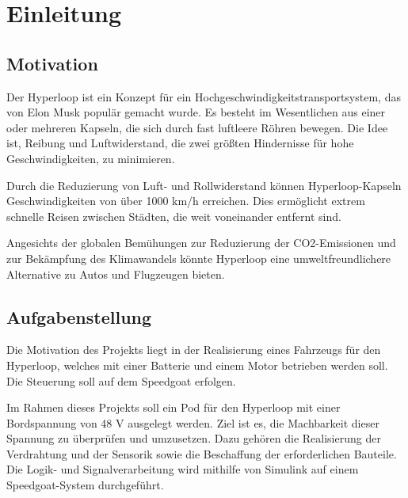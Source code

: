\chapter{Einleitung}

\section{Motivation}
Der Hyperloop ist ein Konzept für ein Hochgeschwindigkeitstransportsystem, das von Elon Musk \cite{Wikipedia:Hyperloop_impact} populär gemacht wurde. Es besteht im Wesentlichen aus einer oder mehreren Kapseln, die sich durch fast luftleere Röhren bewegen. Die Idee ist, Reibung und Luftwiderstand, die zwei größten Hindernisse für hohe Geschwindigkeiten, zu minimieren.

Durch die Reduzierung von Luft- und Rollwiderstand können Hyperloop-Kapseln Geschwindigkeiten von über 1000 km/h erreichen. Dies ermöglicht extrem schnelle Reisen zwischen Städten, die weit voneinander entfernt sind.

Angesichts der globalen Bemühungen zur Reduzierung der CO2-Emissionen und zur Bekämpfung des Klimawandels könnte Hyperloop eine umweltfreundlichere Alternative zu Autos und Flugzeugen bieten.









\section{Aufgabenstellung}
Die Motivation des Projekts liegt in der Realisierung eines Fahrzeugs für den Hyperloop, welches mit einer Batterie und einem Motor betrieben werden soll. Die Steuerung soll auf dem Speedgoat erfolgen.
\newline

Im Rahmen dieses Projekts soll ein Pod für den Hyperloop mit einer Bordspannung von 48 V ausgelegt werden. Ziel ist es, die Machbarkeit dieser Spannung zu überprüfen und umzusetzen. Dazu gehören die Realisierung der Verdrahtung und der Sensorik sowie die Beschaffung der erforderlichen Bauteile. Die Logik- und Signalverarbeitung wird mithilfe von Simulink auf einem Speedgoat-System durchgeführt.


